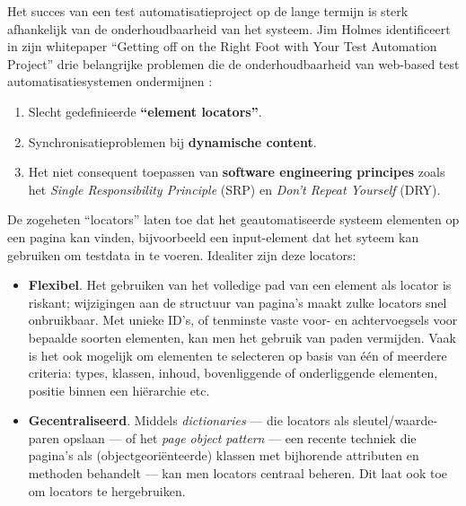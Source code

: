 Het succes van een test automatisatieproject op de lange termijn is sterk afhankelijk van de onderhoudbaarheid van het systeem. Jim Holmes identificeert in zijn whitepaper ``Getting off on the Right Foot with Your Test Automation Project'' drie belangrijke problemen die de onderhoudbaarheid van web-based test automatisatiesystemen ondermijnen \autocite{Holmes2020}:

\begin{enumerate}
    \item Slecht gedefinieerde \textbf{``element locators''}.
    \item Synchronisatieproblemen bij \textbf{dynamische content}.
    \item Het niet consequent toepassen van \textbf{software engineering principes} zoals het \emph{Single Responsibility Principle} (SRP) en \emph{Don't Repeat Yourself} (DRY).
\end{enumerate}

De zogeheten ``locators'' laten toe dat het geautomatiseerde systeem elementen op een pagina kan vinden, bijvoorbeeld een input-element dat het syteem kan gebruiken om testdata in te voeren. Idealiter zijn deze locators:

\begin{itemize}
    \item \textbf{Flexibel}. Het gebruiken van het volledige pad van een element als locator is riskant; wijzigingen aan de structuur van pagina's maakt zulke locators snel onbruikbaar. Met unieke ID's, of tenminste vaste voor- en achtervoegsels voor bepaalde soorten elementen, kan men het gebruik van paden vermijden. Vaak is het ook mogelijk om elementen te selecteren op basis van één of meerdere criteria: types, klassen, inhoud, bovenliggende of onderliggende elementen, positie binnen een hiërarchie etc.
    \item \textbf{Gecentraliseerd}. Middels \emph{dictionaries} — die locators als sleutel/waarde-paren opslaan — of het \emph{page object pattern} — een recente techniek die pagina's als (objectgeoriënteerde) klassen met bijhorende attributen en methoden behandelt — kan men locators centraal beheren. Dit laat ook toe om locators te hergebruiken.
\end{itemize}

